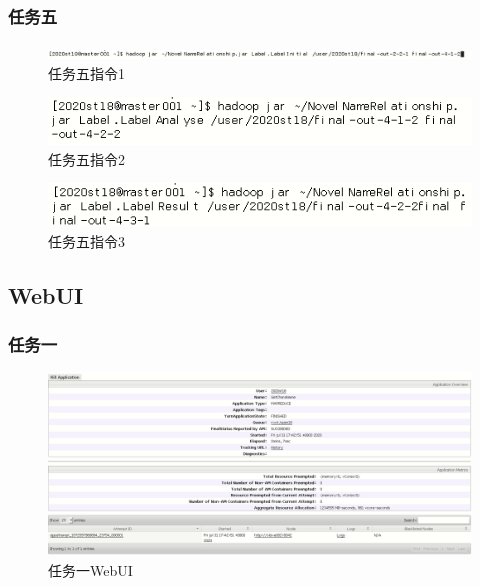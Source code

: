 \documentclass[a4paper,UTF8]{article}
\numberwithin{equation}{section}
\begin{document}
\subsubsection{任务五}
\begin{figure}[H]
    \centering
    \includegraphics[width = 15cm]{task5-1-input.png}
    \caption{任务五指令1}
\end{figure}
\begin{figure}[H]
    \centering
    \includegraphics[width = 15cm]{task5-2-input.png}
    \caption{任务五指令2}
\end{figure}
\begin{figure}[H]
    \centering
    \includegraphics[width = 15cm]{task5-3-input.png}
    \caption{任务五指令3}
\end{figure}

\subsection{WebUI}
\subsubsection{任务一}
\begin{figure}[H]
    \centering
    \includegraphics[width = 15cm]{task1-1-success.png}
    \caption{任务一WebUI}
\end{figure}
\end{document}
